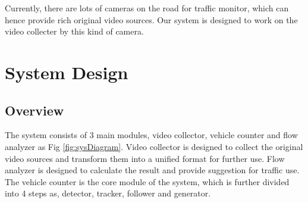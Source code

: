 \documentclass[draftclsnofoot,onecolumn]{IEEEtran}
\begin{document}
	Currently, there are lots of cameras on the road for traffic monitor, which can hence provide rich original video sources. Our system is designed to work on the video collecter by this kind of camera.

\section{System Design}
	\subsection{Overview}
	The system consists of 3 main modules, video collector, vehicle counter and flow analyzer as Fig \ref{fig:sysDiagram}. Video collector is designed to collect the original video sources and transform them into a unified format for further use. Flow analyzer is designed to calculate the result and provide suggestion for traffic use. The vehicle counter is the core module of the system, which is further divided into 4 steps as, detector, tracker, follower and generator. 
	
\end{document}
